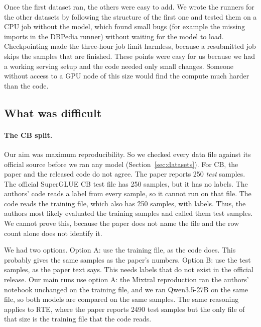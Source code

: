 \par\medskip

Once the first dataset ran, the others were easy to add. We wrote the
runners for the other datasets by following the structure of the first one
and tested them on a CPU job without the model, which found small bugs
(for example the missing imports in the DBPedia runner) without waiting for
the model to load. Checkpointing made the three-hour job limit harmless,
because a resubmitted job skips the samples that are finished. These points
were easy for us because we had a working serving setup and the code needed
only small changes. Someone without access to a GPU node of this size would
find the compute much harder than the code.

\subsection{What was difficult}
\paragraph{The CB split.}
Our aim was maximum reproducibility. So we checked every data file against its
official source before we ran any model (Section~\ref{sec:datasets}). For CB,
the paper and the released code do not agree. The paper reports 250
\emph{test} samples. The official SuperGLUE CB test file has 250 samples, but
it has no labels. The authors' code reads a label from every sample, so it
cannot run on that file. The code reads the training file, which also has 250
samples, with labels. Thus, the authors most likely evaluated the training
samples and called them test samples. We cannot prove this, because the paper
does not name the file and the row count alone does not identify it.

We had two options. Option A: use the training file, as the code does. This
probably gives the same samples as the paper's numbers. Option B: use the test
samples, as the paper text says. This needs labels that do not exist in the
official release. Our main runs use option A: the Mixtral reproduction ran the
authors' notebook unchanged on the training file, and we ran Qwen3.5-27B on
the same file, so both models are compared on the same samples. The same
reasoning applies to RTE, where the paper reports 2490 test samples but the
only file of that size is the training file that the code reads.


